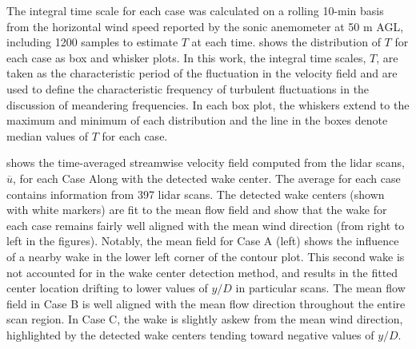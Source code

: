 \documentclass[aip,amsmath,amssymb,preprint,]{revtex4-1}
\begin{document}


The integral time scale for each case was calculated on a rolling 10-min basis from the horizontal wind speed reported by the sonic anemometer at 50 m AGL, including 1200 samples to estimate $T$ at each time. 
 shows the distribution of $T$ for each case as box and whisker plots.
In this work, the integral time scales, $T$, are taken as the characteristic period of the fluctuation in the velocity field and are used to define the characteristic frequency of turbulent fluctuations in the discussion of meandering frequencies. 
In each box plot, the whiskers extend to the maximum and minimum of each distribution and the line in the boxes denote median values of $T$ for each case.


 shows the time-averaged streamwise velocity field computed from the lidar scans, $\overline{u}$, for each Case Along with the detected wake center.
The average for each case contains information from 397 lidar scans. 
The detected wake centers (shown with white markers) are fit to the mean flow field and show that the wake for each case remains fairly well aligned with the mean wind direction (from right to left in the figures).
Notably, the mean field for Case A (left) shows the influence of a nearby wake in the lower left corner of the contour plot.
This second wake is not accounted for in the wake center detection method, and results in the fitted center location drifting to lower values of $y/D$ in particular scans. 
The mean flow field in Case B is well aligned with the mean flow direction throughout the entire scan region.
In Case C, the wake is slightly askew from the mean wind direction, highlighted by the detected wake centers tending toward negative values of $y/D$.
\end{document}
